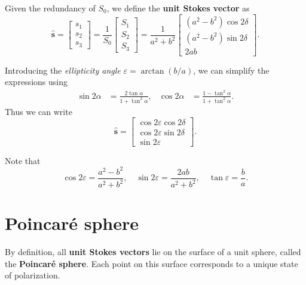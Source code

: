 Given the redundancy of $S_0$, we define the \textbf{unit Stokes vector} as
\begin{equation}
    \hat{\mathbf{s}} =
    \begin{bmatrix}
        s_1 \\ s_2 \\ s_3
    \end{bmatrix}
    =
    \frac{1}{S_0}
    \begin{bmatrix}
        S_1 \\ S_2 \\ S_3
    \end{bmatrix}
    =
    \frac{1}{a^2 + b^2}
    \begin{bmatrix}
        (a^2 - b^2)\cos 2\delta\\[4pt]
        (a^2 - b^2)\sin 2\delta\\[4pt]
        2ab
    \end{bmatrix}.
\end{equation}

Introducing the \emph{ellipticity angle} $\varepsilon = \arctan(b/a)$, we can simplify the expressions using
\begin{align}
    \sin 2\alpha &= \frac{2\tan\alpha}{1+\tan^2\alpha}, &
    \cos 2\alpha &= \frac{1-\tan^2\alpha}{1+\tan^2\alpha}.
\end{align}
Thus we can write
\begin{equation}
    \hat{\mathbf{s}} =
    \begin{bmatrix}
        \cos 2\varepsilon \cos 2\delta\\[4pt]
        \cos 2\varepsilon \sin 2\delta\\[4pt]
        \sin 2\varepsilon
    \end{bmatrix}.
\end{equation}

\medskip
Note that
\[
\cos 2\varepsilon = \frac{a^2 - b^2}{a^2 + b^2},
\quad
\sin 2\varepsilon = \frac{2ab}{a^2 + b^2},
\quad
\tan \varepsilon = \frac{b}{a}.
\]

\section{Poincaré sphere}

By definition, all \textbf{unit Stokes vectors} lie on the surface of a unit sphere,  
called the \textbf{Poincaré sphere}. Each point on this surface corresponds to a unique state of polarization.

